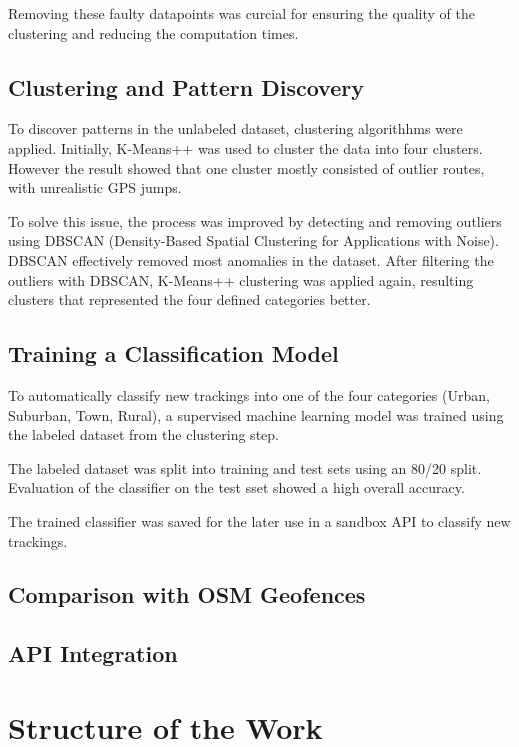 \documentclass[a4paper,12pt,twoside]{scrreprt}
\begin{document}
Removing these faulty datapoints was curcial for ensuring the quality of the
clustering and reducing the computation times.

\subsection{Clustering and Pattern Discovery}
To discover patterns in the unlabeled dataset, clustering algorithhms were
applied.
Initially, K-Means++ was used to cluster the data into four clusters. However
the result showed that one cluster mostly consisted of outlier routes, with
unrealistic GPS jumps.

To solve this issue, the process was improved by detecting and removing
outliers using DBSCAN (Density-Based Spatial Clustering for Applications with
Noise). DBSCAN effectively removed most anomalies in the dataset. After
filtering the outliers with DBSCAN, K-Means++ clustering was applied again,
resulting clusters that represented the four defined categories better.

\subsection{Training a Classification Model}
To automatically classify new trackings into one of the four categories (Urban,
Suburban, Town, Rural), a supervised machine learning model was trained using
the labeled dataset from the clustering step.

The labeled dataset was split into training and test sets using an 80/20 split.
Evaluation of the classifier on the test sset showed a high overall accuracy.

The trained classifier was saved for the later use in a sandbox API to classify
new trackings.

\subsection{Comparison with OSM Geofences}

\subsection{API Integration}

\section{Structure of the Work}
\end{document}
